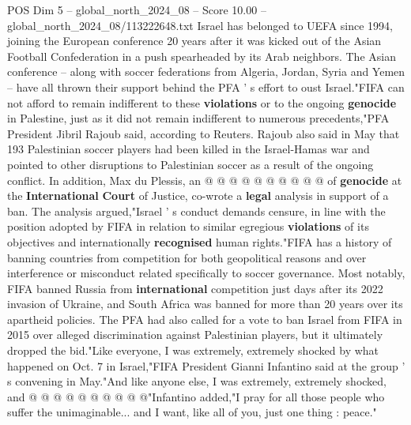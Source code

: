 \begin{textsample}{POS Dim 5 – global\_north\_2024\_08 – Score 10.00 – global\_north\_2024\_08/113222648.txt}
Israel has belonged to UEFA since 1994, joining the European conference 20 years after it was kicked out of the Asian Football Confederation in a push spearheaded by its Arab neighbors.
The Asian conference -- along with soccer federations from Algeria, Jordan, Syria and Yemen -- have all thrown their support behind the PFA ' s effort to oust Israel."FIFA can not afford to remain indifferent to these \textbf{violations} or to the ongoing \textbf{genocide} in Palestine, just as it did not remain indifferent to numerous precedents,"PFA President Jibril Rajoub said, according to Reuters.
Rajoub also said in May that 193 Palestinian soccer players had been killed in the Israel-Hamas war and pointed to other disruptions to Palestinian soccer as a result of the ongoing conflict.
In addition, Max du Plessis, an @ @ @ @ @ @ @ @ @ @ of \textbf{genocide} at the \textbf{International} \textbf{Court} of Justice, co-wrote a \textbf{legal} analysis in support of a ban.
The analysis argued,"Israel ' s conduct demands censure, in line with the position adopted by FIFA in relation to similar egregious \textbf{violations} of its objectives and internationally \textbf{recognised} human rights."FIFA has a history of banning countries from competition for both geopolitical reasons and over interference or misconduct related specifically to soccer governance.
Most notably, FIFA banned Russia from \textbf{international} competition just days after its 2022 invasion of Ukraine, and South Africa was banned for more than 20 years over its apartheid policies.
The PFA had also called for a vote to ban Israel from FIFA in 2015 over alleged discrimination against Palestinian players, but it ultimately dropped the bid."Like everyone, I was extremely, extremely shocked by what happened on Oct. 7 in Israel,"FIFA President Gianni Infantino said at the group ' s convening in May."And like anyone else, I was extremely, extremely shocked, and @ @ @ @ @ @ @ @ @ @"Infantino added,"I pray for all those people who suffer the unimaginable... and I want, like all of you, just one thing : peace."

\end{textsample}
